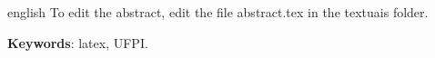\begin{resumo}[Abstract]
\begin{otherlanguage*}{english}  
	\vspace{\onelineskip}
	\noindent
		To edit the abstract, edit the file abstract.tex in the textuais folder. 
		\par\textbf{Keywords}: latex, UFPI.
\end{otherlanguage*}
\end{resumo}